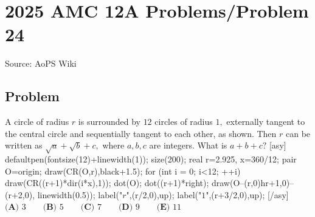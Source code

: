 \documentclass[12pt]{article}
\begin{document}
\section*{{2025 AMC 12A Problems/Problem 24}}
Source: AoPS Wiki

\subsection*{Problem}
A circle of radius $r$ is surrounded by $12$ circles of radius $1,$ externally tangent to the central circle and sequentially tangent to each other, as shown. Then $r$ can be written as $\sqrt a + \sqrt b + c,$ where $a, b, c$ are integers. What is $a+b+c?$ [asy] defaultpen(fontsize(12)+linewidth(1)); size(200); real r=2.925, x=360/12; pair O=origin; draw(CR(O,r),black+1.5); for (int i = 0; i<12; ++i) { draw(CR((r+1)*dir(i*x),1)); } dot(O); dot((r+1)*right); draw(O--(r,0)^^(r+1,0)--(r+2,0), linewidth(0.5)); label("$r$",(r/2,0),up); label("$1$",(r+3/2,0),up); [/asy] $\textbf{(A) } 3 \qquad \textbf{(B) } 5 \qquad \textbf{(C) } 7 \qquad \textbf{(D) } 9 \qquad \textbf{(E) } 11$
\end{document}
